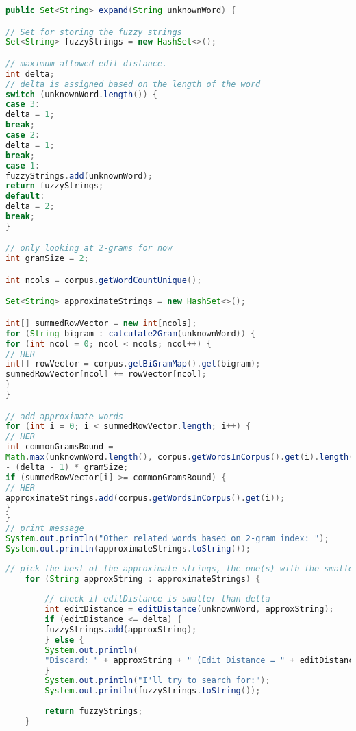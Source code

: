 \begin{lstlisting}[language=Java, caption=This is a code example., label=lst:2-gram]
public Set<String> expand(String unknownWord) {

// Set for storing the fuzzy strings
Set<String> fuzzyStrings = new HashSet<>();

// maximum allowed edit distance.
int delta;
// delta is assigned based on the length of the word
switch (unknownWord.length()) {
case 3:
delta = 1;
break;
case 2:
delta = 1;
break;
case 1:
fuzzyStrings.add(unknownWord);
return fuzzyStrings;
default:
delta = 2;
break;
}

// only looking at 2-grams for now
int gramSize = 2;

int ncols = corpus.getWordCountUnique();

Set<String> approximateStrings = new HashSet<>();

int[] summedRowVector = new int[ncols];
for (String bigram : calculate2Gram(unknownWord)) {
for (int ncol = 0; ncol < ncols; ncol++) {
// HER
int[] rowVector = corpus.getBiGramMap().get(bigram);
summedRowVector[ncol] += rowVector[ncol];
}
}

// add approximate words
for (int i = 0; i < summedRowVector.length; i++) {
// HER
int commonGramsBound =
Math.max(unknownWord.length(), corpus.getWordsInCorpus().get(i).length()) - 1
- (delta - 1) * gramSize;
if (summedRowVector[i] >= commonGramsBound) {
// HER
approximateStrings.add(corpus.getWordsInCorpus().get(i));
}
}
// print message
System.out.println("Other related words based on 2-gram index: ");
System.out.println(approximateStrings.toString());
\end{lstlisting}


\begin{lstlisting}[language=Java, caption=This is a code example., label=lst:2-gram]
	// pick the best of the approximate strings, the one(s) with the smallest edit distance.
	for (String approxString : approximateStrings) {
	
		// check if editDistance is smaller than delta
		int editDistance = editDistance(unknownWord, approxString);
		if (editDistance <= delta) {
		fuzzyStrings.add(approxString);
		} else {
		System.out.println(
		"Discard: " + approxString + " (Edit Distance = " + editDistance + " > " + delta + ")");
		}
		System.out.println("I'll try to search for:");
		System.out.println(fuzzyStrings.toString());
		
		return fuzzyStrings;
	}
\end{lstlisting}



